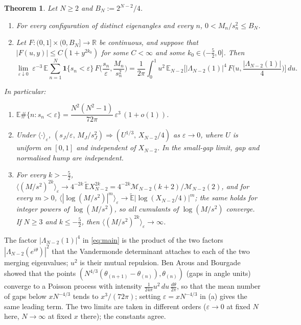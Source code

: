 \documentclass[12pt]{amsart}
\newtheorem{theorem}{Theorem}
\theoremstyle{remark}
\newcommand{\E}{\mathbb{E}}
\newcommand{\Et}{\widetilde{\mathbb{E}}}
\newcommand{\eps}{\varepsilon}
\newcommand{\1}{\mathbf{1}}
\begin{document}
\begin{theorem}\label{thm:main}
Let $N\ge2$ and $B_N:=2^{N-2}/4$.
\begin{enumerate}
\item[(i)] For every configuration of distinct eigenangles and every $n$,
$0<M_n/s_n^2\le B_N$.
\item[(ii)] Let $F:(0,1]\times(0,B_N]\to\mathbb R$ be continuous, and
suppose that $|F(u,y)|\le C(1+y^{2k_0})$ for some $C<\infty$ and some
$k_0\in(-\frac52,0]$. Then
\begin{equation}\label{eq:main}
\lim_{\eps\downarrow0}\;\eps^{-3}\,
\E\sum_{n=1}^N\1\{s_n<\eps\}\,F\Big(\frac{s_n}{\eps},\frac{M_n}{s_n^2}\Big)
=\frac1{2\pi}\int_0^1u^2\,
\E_{N-2}\Big[|\Lambda_{N-2}(1)|^4\,
F\Big(u,\frac{|\Lambda_{N-2}(1)|}{4}\Big)\Big]\,du .
\end{equation}
\end{enumerate}
In particular:
\begin{enumerate}
\item[(a)] $\E\#\{n:s_n<\eps\}=\dfrac{N^2(N^2-1)}{72\pi}\,\eps^3\,(1+o(1))$.
\item[(b)] Under $\langle\cdot\rangle_\eps$,
$(s_J/\eps,\,M_J/s_J^2)\Rightarrow(U^{1/3},\,X_{N-2}/4)$ as $\eps\to0$,
where $U$ is uniform on $[0,1]$ and independent of $X_{N-2}$. In the
small-gap limit, gap and normalised hump are independent.
\item[(c)] For every $k>-\frac52$,
$\langle(M/s^2)^{2k}\rangle_\eps\to4^{-2k}\,\Et X_{N-2}^{2k}
=4^{-2k}\mathcal M_{N-2}(k+2)/\mathcal M_{N-2}(2)$, and for every $m>0$,
$\langle|\log(M/s^2)|^m\rangle_\eps\to\Et|\log(X_{N-2}/4)|^m$; the same
holds for integer powers of $\log(M/s^2)$, so all cumulants of
$\log(M/s^2)$ converge. If $N\ge3$ and $k\le-\frac52$, then
$\langle(M/s^2)^{2k}\rangle_\eps\to\infty$.
\end{enumerate}
\end{theorem}

The factor $|\Lambda_{N-2}(1)|^4$ in \eqref{eq:main} is the product of the
two factors $|\Lambda_{N-2}(e^{i\theta})|^2$ that the Vandermonde
determinant attaches to each of the two merging eigenvalues; $u^2$ is their
mutual repulsion. Ben Arous and Bourgade \cite[Thm.~1.1]{BAB13} showed
that the points $(N^{4/3}(\theta_{(n+1)}-\theta_{(n)}),\theta_{(n)})$
(gaps in angle units) converge to a Poisson process with intensity
$\frac1{24\pi}u^2\,du\,\frac{d\theta}{2\pi}$, so that the mean number of
gaps below $xN^{-4/3}$ tends to $x^3/(72\pi)$; setting $\eps=xN^{-4/3}$ in
(a) gives the same leading term. The two limits are taken in different
orders ($\eps\to0$ at fixed $N$ here, $N\to\infty$ at fixed $x$ there);
the constants agree.
\end{document}

